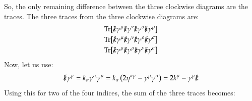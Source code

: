 \documentclass{article}
\begin{document}
So, the only remaining difference between the three clockwise diagrams are the traces. The three traces from the three clockwise diagrams are:
\begin{equation}
\begin{gathered}
    \Tr[
        \slashed{k}\gamma^\mu
        \slashed{k}\gamma^\nu
        \slashed{k}\gamma^\sigma
        \slashed{k}\gamma^\rho
    ]
    \\
    \Tr[
        \slashed{k}\gamma^\mu
        \slashed{k}\gamma^\nu
        \slashed{k}\gamma^\rho
        \slashed{k}\gamma^\sigma
    ]
    \\
    \Tr[
        \slashed{k}\gamma^\mu
        \slashed{k}\gamma^\rho
        \slashed{k}\gamma^\nu
        \slashed{k}\gamma^\sigma
    ]
\end{gathered}
\end{equation}
Now, let us use:
\begin{equation}
    \slashed{k}\gamma^\mu = k_\alpha \gamma^\alpha \gamma^\mu = k_\alpha \left(2 \eta^{\alpha\mu} - \gamma^\mu \gamma^\alpha\right) = 
    2 k^\mu - \gamma^\mu \slashed{k}
\end{equation}
Using this for two of the four indices, the sum of the three traces becomes:
\end{document}

